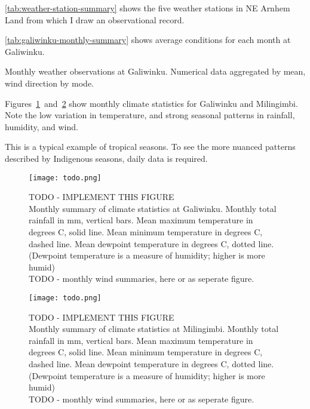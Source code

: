 \autoref{tab:weather-station-summary} shows the five weather stations in NE
Arnhem Land from which I draw an observational record.

\autoref{tab:galiwinku-monthly-summary} shows average conditions for each
month at Galiwinku.

\begin{landscape}
\begin{table}
    
    \caption{Monthly weather observations at Galiwinku.
        Numerical data aggregated by mean, wind direction by mode.}
    \label{tab:galiwinku-monthly-summary}
\end{table}
\end{landscape}


Figures~\ref{fig:galiwinku-climograph}~and~\ref{fig:milingimbi-climograph}
show monthly climate statistics for Galiwinku and Milingimbi.
Note the low variation in temperature, and strong seasonal patterns in
rainfall, humidity, and wind.

This is a typical example of tropical seasons.  To see the more nuanced
patterns described by Indigenous seasons, daily data is required.

\begin{figure}[h]
    \centering
    \texttt{[image: todo.png]}
    \caption[Monthly Climograph for Galiwinku]{
        TODO - IMPLEMENT THIS FIGURE\\
        Monthly summary of climate statistics at Galiwinku.
        Monthly total rainfall in mm, vertical bars.
        Mean maximum temperature in degrees C, solid line.
        Mean minimum temperature in degrees C, dashed line.
        Mean dewpoint temperature in degrees C, dotted line.
        (Dewpoint temperature is a measure of humidity; higher is more humid)
        ~\\
        TODO - monthly wind summaries, here or as seperate figure.
        }
    \label{fig:galiwinku-climograph}
\end{figure}

\begin{figure}[h]
    \centering
    \texttt{[image: todo.png]}
    \caption[Monthly Climograph for Milingimbi]{
        TODO - IMPLEMENT THIS FIGURE\\
        Monthly summary of climate statistics at Milingimbi.
        Monthly total rainfall in mm, vertical bars.
        Mean maximum temperature in degrees C, solid line.
        Mean minimum temperature in degrees C, dashed line.
        Mean dewpoint temperature in degrees C, dotted line.
        (Dewpoint temperature is a measure of humidity; higher is more humid)
        ~\\
        TODO - monthly wind summaries, here or as seperate figure.
        }
    \label{fig:milingimbi-climograph}
\end{figure}



